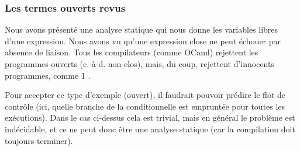 %
\begin{frame}
\frametitle{Les termes ouverts revus}

Nous avons présenté une analyse statique qui nous donne les variables
libres d'une expression. Nous avons vu qu'une expression close ne peut
échouer par absence de liaison. Tous les compilateurs (comme OCaml)
rejettent les programmes ouverts (c.-à-d. non-clos), mais, du coup,
rejettent d'innocents programmes, comme \Xif{} \Xtrue{} \Xthen{}
\num{1} \Xelse{} .

\bigskip

Pour accepter ce type d'exemple (ouvert), il faudrait pouvoir prédire
le flot de contrôle (ici, quelle branche de la conditionnelle est
empruntée pour toutes les exécutions). Dans le cas ci-dessus cela est
trivial, mais en général le problème est indécidable, et ce ne peut
donc être une analyse statique (car la compilation doit toujours
terminer).

\end{frame}
